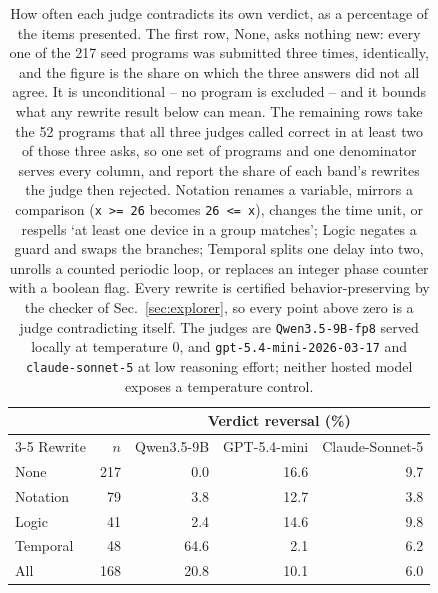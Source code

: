 \begin{table}[t]
\centering
\caption{How often each judge contradicts its own verdict, as a percentage of the items presented. The first row, None, asks nothing new: every one of the 217 seed programs was submitted three times, identically, and the figure is the share on which the three answers did not all agree. It is unconditional -- no program is excluded -- and it bounds what any rewrite result below can mean. The remaining rows take the 52 programs that all three judges called correct in at least two of those three asks, so one set of programs and one denominator serves every column, and report the share of each band's rewrites the judge then rejected. Notation renames a variable, mirrors a comparison (\texttt{x >= 26} becomes \texttt{26 <= x}), changes the time unit, or respells `at least one device in a group matches'; Logic negates a guard and swaps the branches; Temporal splits one delay into two, unrolls a counted periodic loop, or replaces an integer phase counter with a boolean flag. Every rewrite is certified behavior-preserving by the checker of Sec.~\ref{sec:explorer}, so every point above zero is a judge contradicting itself. The judges are \texttt{Qwen3.5-9B-fp8} served locally at temperature 0, and \texttt{gpt-5.4-mini-2026-03-17} and \texttt{claude-sonnet-5} at low reasoning effort; neither hosted model exposes a temperature control.}
\label{tab:judge}
\footnotesize
\setlength{\tabcolsep}{3pt}
\begin{tabular}{lr rrr}
\toprule
 & & \multicolumn{3}{c}{Verdict reversal (\%)} \\
\cmidrule(lr){3-5}
Rewrite & $n$ & Qwen3.5-9B & GPT-5.4-mini & Claude-Sonnet-5 \\
\midrule
None & 217 & 0.0 & 16.6 & 9.7 \\
\midrule
Notation & 79 & 3.8 & 12.7 & 3.8 \\
Logic & 41 & 2.4 & 14.6 & 9.8 \\
Temporal & 48 & 64.6 & 2.1 & 6.2 \\
\midrule
All & 168 & 20.8 & 10.1 & 6.0 \\
\bottomrule
\end{tabular}
\end{table}
